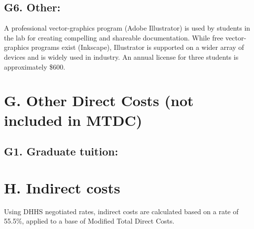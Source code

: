 \documentclass[11pt,oneside]{memoir}
\begin{document}
\subsection*{G6. Other:}

A professional vector-graphics program (Adobe Illustrator) is used by students in the lab for creating compelling and shareable documentation.  While free vector-graphics programs exist (Inkscape), Illustrator is supported on a wider array of devices and is widely used in industry.  An annual license for three students is approximately \$600.


\section*{G. Other Direct Costs (not included in MTDC)}
%

\subsection{G1. Graduate tuition:}


\section*{H. Indirect costs} 

Using DHHS negotiated rates, indirect costs are calculated based on a rate of 55.5\%, applied to a base of Modified Total Direct Costs. 
\end{document}
